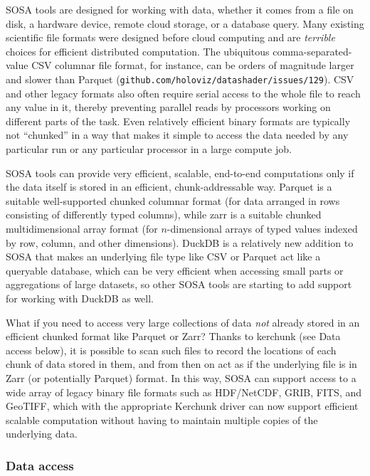 SOSA tools are designed for working with data, whether it comes from a file on disk, a hardware device, remote cloud storage, or a database query. Many existing scientific file formats were designed before cloud computing and are \emph{terrible} choices for efficient distributed computation. The ubiquitous comma-separated-value CSV columnar file format, for instance, can be orders of magnitude larger and slower than Parquet (\texttt{github.com/holoviz/datashader/issues/129}). CSV and other legacy formats also often require serial access to the whole file to reach any value in it, thereby preventing parallel reads by processors working on different parts of the task. Even relatively efficient binary formats are typically not ``chunked'' in a way that makes it simple to access the data needed by any particular run or any particular processor in a large compute job.

SOSA tools can provide very efficient, scalable, end-to-end computations only if the data itself is stored in an efficient, chunk-addressable way. Parquet is a suitable well-supported chunked columnar format (for data arranged in rows consisting of differently typed columns), while zarr is a suitable chunked multidimensional array format (for $n$-dimensional arrays of typed values indexed by row, column, and other dimensions). DuckDB is a relatively new addition to SOSA that makes an underlying file type like CSV or Parquet act like a queryable database, which can be very efficient when accessing small parts or aggregations of large datasets, so other SOSA tools are starting to add support for working with DuckDB as well.

What if you need to access very large collections of data \emph{not} already stored in an efficient chunked format like Parquet or Zarr? Thanks to kerchunk (see Data access below), it is possible to scan such files to record the locations of each chunk of data stored in them, and from then on act as if the underlying file is in Zarr (or potentially Parquet) format. In this way, SOSA can support access to a wide array of legacy binary file formats such as HDF/NetCDF, GRIB, FITS, and GeoTIFF, which with the appropriate Kerchunk driver can now support efficient scalable computation without having to maintain multiple copies of the underlying data.

\subsubsection{Data access}

